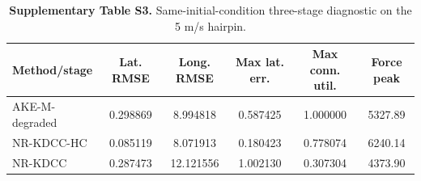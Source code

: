 \documentclass[10pt]{article}
\begin{document}
\begin{table}[H]
\centering
\caption*{\textbf{Supplementary Table S3.} Same-initial-condition three-stage diagnostic on the 5 m/s hairpin.}
\small
\begin{tabular}{lccccc}
\toprule
Method/stage & Lat. RMSE & Long. RMSE & Max lat. err. & Max conn. util. & Force peak\\
\midrule
AKE-M-degraded & 0.298869 & 8.994818 & 0.587425 & 1.000000 & 5327.89\\
NR-KDCC-HC & 0.085119 & 8.071913 & 0.180423 & 0.778074 & 6240.14\\
NR-KDCC & 0.287473 & 12.121556 & 1.002130 & 0.307304 & 4373.90\\
\bottomrule
\end{tabular}
\end{table}
\end{document}
